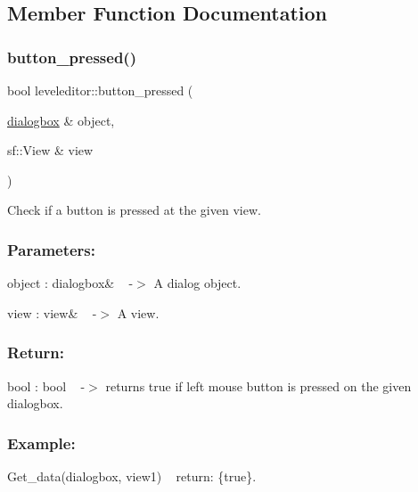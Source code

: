 \subsection{Member Function Documentation}
\mbox{\label{classleveleditor_aefcb8b0819a53d39936400d5c4f4952e}} 
\subsubsection{\texorpdfstring{button\+\_\+pressed()}{button\_pressed()}}
{\footnotesize\ttfamily bool leveleditor\+::button\+\_\+pressed (\begin{DoxyParamCaption}\item[{\hyperlink{classdialogbox}{dialogbox} \&}]{object,  }\item[{sf\+::\+View \&}]{view }\end{DoxyParamCaption})\hspace{0.3cm}{\ttfamily [private]}}



Check if a button is pressed at the given view. 

\subsubsection*{Parameters\+: }

object \+: dialogbox\& ~\newline
-\/$>$ A dialog object.

view \+: view\& ~\newline
-\/$>$ A view.

\subsubsection*{Return\+: }

bool \+: bool ~\newline
-\/$>$ returns true if left mouse button is pressed on the given dialogbox.

\subsubsection*{Example\+: }

Get\+\_\+data(dialogbox, view1) ~\newline
return\+: \{true\}. 

